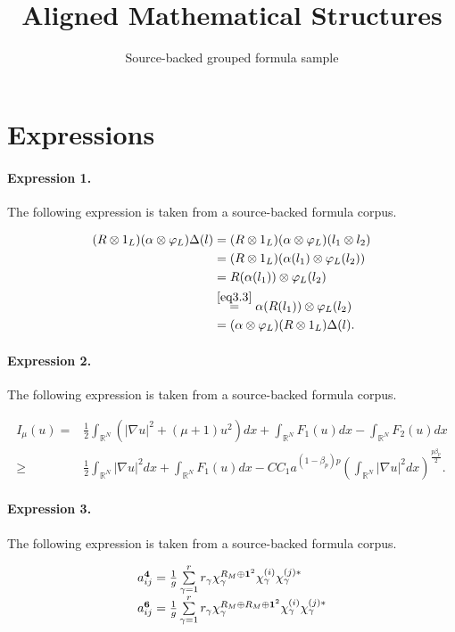 \documentclass[11pt]{article}
\title{Aligned Mathematical Structures}
\author{Source-backed grouped formula sample}
\date{}
\begin{document}
\maketitle
\section{Expressions}
\paragraph{Expression 1.} The following expression is taken from a source-backed formula corpus.

\begin{align*}(R \otimes 1_L)(\alpha \otimes \varphi_L) \Delta(l) &=(R \otimes 1_L)(\alpha \otimes \varphi_L)(l_1 \otimes l_2) \\&=(R \otimes 1_L)(\alpha(l_1) \otimes \varphi_L(l_2)) \\&=R(\alpha(l_1)) \otimes \varphi_L(l_2) \\&\overset{\eqref{eq3.3}}{=} \alpha(R(l_1)) \otimes \varphi_L(l_2) \\&=(\alpha \otimes \varphi_L)(R \otimes 1_L)\Delta(l).\end{align*}

\paragraph{Expression 2.} The following expression is taken from a source-backed formula corpus.

\begin{align*}I_\mu(u)=&\frac{1}{2} \int_{\mathbb{R}^N}\left(|\nabla u|^2+(\mu+1)u^2\right) d x+\int_{\mathbb{R}^N} F_1(u)d x-\int_{\mathbb{R}^N} F_2(u) d x\\\geq & \frac{1}{2} \int_{\mathbb{R}^N}|\nabla u|^2 d x+\int_{\mathbb{R}^N} F_1(u)d x-C C_1 a^{\left(1-\beta_p\right) p}\left(\int_{\mathbb{R}^N}|\nabla u|^2 d x\right)^{\frac{p\beta_p }{2}}.\end{align*}

\paragraph{Expression 3.} The following expression is taken from a source-backed formula corpus.

\begin{align*}\begin{array}{l}a_{ij}^{{\bf 4}}= \frac{1}{g}\sum\limits_{\gamma=1}^{r}r_{\gamma }\chi_{\gamma }^{R_M \oplus {\bf 1}^2 }\chi_{\gamma }^{(i)}\chi_{\gamma }^{(j)*} \\a_{ij}^{{\bf 6}}=\frac{1}{g}\sum\limits_{\gamma=1}^{r}r_{\gamma }\chi_{\gamma }^{R_M \oplus R_M \oplus {\bf 1}^2 }\chi_{\gamma }^{(i)}\chi_{\gamma }^{(j)*} \\\end{array}\end{align*}
\end{document}
